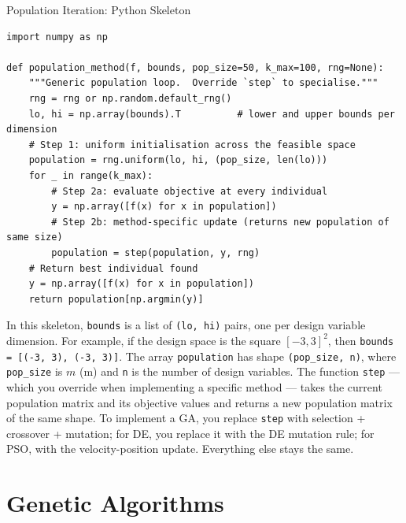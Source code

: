 \documentclass[aspectratio=169,10pt]{beamer}
\begin{document}
\begin{frame}[fragile]{Population Iteration: Python Skeleton}
\begin{lstlisting}[style=python, caption={Generic population method skeleton (Python / NumPy)}]
import numpy as np

def population_method(f, bounds, pop_size=50, k_max=100, rng=None):
    """Generic population loop.  Override `step` to specialise."""
    rng = rng or np.random.default_rng()
    lo, hi = np.array(bounds).T          # lower and upper bounds per dimension
    # Step 1: uniform initialisation across the feasible space
    population = rng.uniform(lo, hi, (pop_size, len(lo)))
    for _ in range(k_max):
        # Step 2a: evaluate objective at every individual
        y = np.array([f(x) for x in population])
        # Step 2b: method-specific update (returns new population of same size)
        population = step(population, y, rng)
    # Return best individual found
    y = np.array([f(x) for x in population])
    return population[np.argmin(y)]
\end{lstlisting}

  In this skeleton, \texttt{bounds} is a list of \texttt{(lo, hi)}
  pairs, one per design variable dimension.  For example, if the
  design space is the square $[-3, 3]^2$, then
  \texttt{bounds = [(-3, 3), (-3, 3)]}.  The array
  \texttt{population} has shape \texttt{(pop\_size, n)}, where
  \texttt{pop\_size} is $m$ (m) and \texttt{n} is the number of
  design variables.  The function \texttt{step} --- which you
  override when implementing a specific method --- takes the current
  population matrix and its objective values and returns a new
  population matrix of the same shape.  To implement a GA, you
  replace \texttt{step} with selection + crossover + mutation; for
  DE, you replace it with the DE mutation rule; for PSO, with the
  velocity-position update.  Everything else stays the same.

\end{frame}

\section{Genetic Algorithms}
\end{document}
